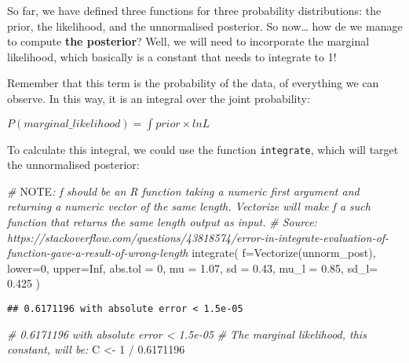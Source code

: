 \documentclass[
]{article}
\newenvironment{Shaded}{\begin{snugshade}}{\end{snugshade}}
\newcommand{\AlertTok}[1]{\textcolor[rgb]{0.94,0.16,0.16}{#1}}
\newcommand{\AttributeTok}[1]{\textcolor[rgb]{0.77,0.63,0.00}{#1}}
\newcommand{\CommentTok}[1]{\textcolor[rgb]{0.56,0.35,0.01}{\textit{#1}}}
\newcommand{\ConstantTok}[1]{\textcolor[rgb]{0.00,0.00,0.00}{#1}}
\newcommand{\DecValTok}[1]{\textcolor[rgb]{0.00,0.00,0.81}{#1}}
\newcommand{\FloatTok}[1]{\textcolor[rgb]{0.00,0.00,0.81}{#1}}
\newcommand{\FunctionTok}[1]{\textcolor[rgb]{0.00,0.00,0.00}{#1}}
\newcommand{\NormalTok}[1]{#1}
\newcommand{\OtherTok}[1]{\textcolor[rgb]{0.56,0.35,0.01}{#1}}
\newcommand{\SpecialCharTok}[1]{\textcolor[rgb]{0.00,0.00,0.00}{#1}}
\begin{document}
So far, we have defined three functions for three probability
distributions: the prior, the likelihood, and the unnormalised
posterior. So now\ldots{} how de we manage to compute \textbf{the
posterior}? Well, we will need to incorporate the marginal likelihood,
which basically is a constant that needs to integrate to 1!

Remember that this term is the probability of the data, of everything we
can observe. In this way, it is an integral over the joint probability:

\(P(marginal\_likelihood)=\int{prior\times lnL}\)

To calculate this integral, we could use the function
\texttt{integrate}, which will target the unnormalised posterior:

\begin{Shaded}
\begin{Highlighting}[]
\CommentTok{\# }\AlertTok{NOTE}\CommentTok{: \textasciigrave{}f\textasciigrave{} should be an R function taking a numeric first argument and returning a numeric vector of the same length. Vectorize will make \textasciigrave{}f\textasciigrave{} a such function that returns the same length output as input.}
\CommentTok{\# Source: https://stackoverflow.com/questions/43818574/error{-}in{-}integrate{-}evaluation{-}of{-}function{-}gave{-}a{-}result{-}of{-}wrong{-}length}
\FunctionTok{integrate}\NormalTok{( }\AttributeTok{f=}\FunctionTok{Vectorize}\NormalTok{(unnorm\_post), }\AttributeTok{lower=}\DecValTok{0}\NormalTok{, }\AttributeTok{upper=}\ConstantTok{Inf}\NormalTok{, }\AttributeTok{abs.tol =} \DecValTok{0}\NormalTok{, }
           \AttributeTok{mu =} \FloatTok{1.07}\NormalTok{, }\AttributeTok{sd =} \FloatTok{0.43}\NormalTok{, }\AttributeTok{mu\_l =} \FloatTok{0.85}\NormalTok{, }\AttributeTok{sd\_l=} \FloatTok{0.425}\NormalTok{ )}
\end{Highlighting}
\end{Shaded}

\begin{verbatim}
## 0.6171196 with absolute error < 1.5e-05
\end{verbatim}

\begin{Shaded}
\begin{Highlighting}[]
\CommentTok{\# 0.6171196 with absolute error \textless{} 1.5e{-}05}
\CommentTok{\# The marginal likelihood, this constant, will be: }
\NormalTok{C  }\OtherTok{\textless{}{-}} \DecValTok{1} \SpecialCharTok{/} \FloatTok{0.6171196}
\end{Highlighting}
\end{Shaded}
\end{document}
